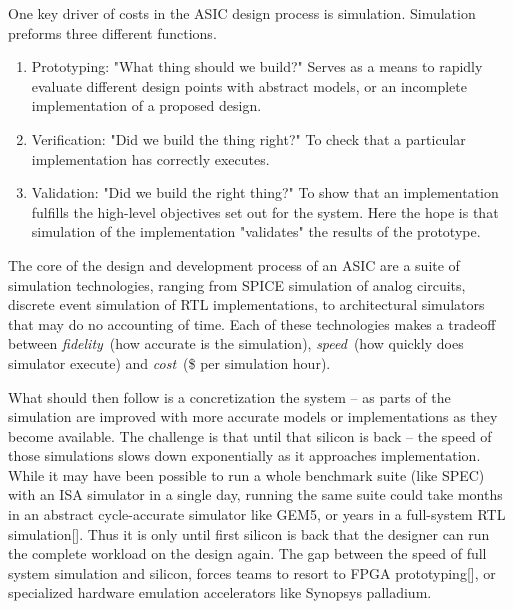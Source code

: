 One key driver of costs in the ASIC design process is simulation. Simulation preforms
three different functions.

\begin{enumerate}

    \item Prototyping: "What thing should we build?" Serves as a means to
        rapidly evaluate different design points with abstract models, or an
        incomplete implementation of a proposed design.

    \item Verification: "Did we build the thing right?" To check that a
        particular implementation has correctly executes.

    \item Validation: "Did we build the right thing?" To show that an
        implementation fulfills the high-level objectives set out for the
        system. Here the hope is that simulation of the implementation
        "validates" the results of the prototype.

\end{enumerate}

The core of the design and development process of an ASIC are a suite of
simulation technologies, ranging from SPICE simulation of analog circuits,
discrete event simulation of RTL implementations, to architectural simulators
that may do no accounting of time.  Each of these technologies makes a tradeoff
between \textit{fidelity}~(how accurate is the simulation), \textit{speed}~(how
quickly does simulator execute) and \textit{cost}~(\$ per simulation hour).


What should then follow is a concretization the system -- as parts of the
simulation are improved with more accurate models or implementations as they
become available. The challenge is that until that silicon is back -- the speed
of those simulations slows down exponentially as it approaches implementation.
While it may have been possible to run a whole benchmark suite (like SPEC) with
an ISA simulator in a single day, running the same suite could take months in
an abstract cycle-accurate simulator like GEM5, or years in a full-system RTL
simulation[]. Thus it is only until first silicon is back that the designer can
run the complete workload on the design again. The gap between the speed of
full system simulation and silicon, forces teams to resort to FPGA
prototyping[], or specialized hardware emulation accelerators like Synopsys
palladium\cite{palladium}.

